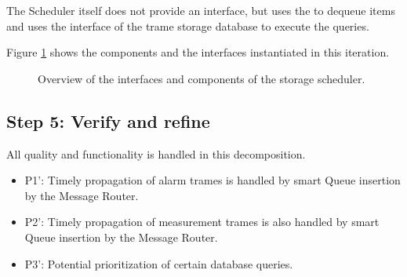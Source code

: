 \npar The Scheduler itself does not provide an interface, but uses the
 to dequeue items and uses the interface of the trame storage
database to execute the queries.

\npar Figure \ref{fig:it3/interfaces} shows the components and the interfaces
instantiated in this iteration.

\begin{figure}[H]
	\begin{centering}
		\caption{Overview of the interfaces and components of the storage scheduler.}
		\label{fig:it3/interfaces}
	\end{centering}
\end{figure}

\subsection{Step 5: Verify and refine}
\label{add:it3/verification}

\npar All quality and functionality is handled in this decomposition.  

\begin{itemize}
	\item P1': Timely propagation of alarm trames is handled by smart Queue
	insertion by the Message Router. 
	\item P2': Timely propagation of measurement trames is also handled by smart
	Queue insertion by the Message Router. 
	\item P3': Potential prioritization of certain database queries. 
\end{itemize}
